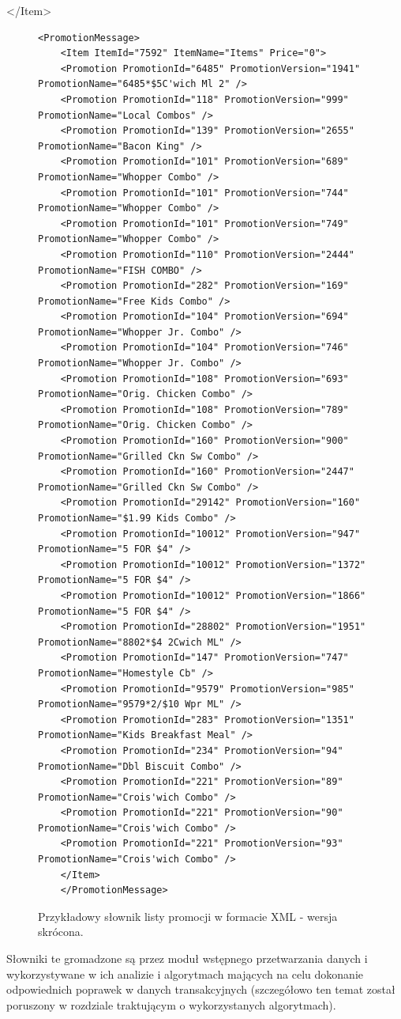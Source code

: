 \documentclass[a4paper]{book}
\begin{document}
</Item>
\begin{figure}
	\begin{lstlisting}[frame=single, breaklines=true]
	<PromotionMessage>
	<Item ItemId="7592" ItemName="Items" Price="0">
	<Promotion PromotionId="6485" PromotionVersion="1941" PromotionName="6485*$5C'wich Ml 2" />
	<Promotion PromotionId="118" PromotionVersion="999" PromotionName="Local Combos" />
	<Promotion PromotionId="139" PromotionVersion="2655" PromotionName="Bacon King" />
	<Promotion PromotionId="101" PromotionVersion="689" PromotionName="Whopper Combo" />
	<Promotion PromotionId="101" PromotionVersion="744" PromotionName="Whopper Combo" />
	<Promotion PromotionId="101" PromotionVersion="749" PromotionName="Whopper Combo" />
	<Promotion PromotionId="110" PromotionVersion="2444" PromotionName="FISH COMBO" />
	<Promotion PromotionId="282" PromotionVersion="169" PromotionName="Free Kids Combo" />
	<Promotion PromotionId="104" PromotionVersion="694" PromotionName="Whopper Jr. Combo" />
	<Promotion PromotionId="104" PromotionVersion="746" PromotionName="Whopper Jr. Combo" />
	<Promotion PromotionId="108" PromotionVersion="693" PromotionName="Orig. Chicken Combo" />
	<Promotion PromotionId="108" PromotionVersion="789" PromotionName="Orig. Chicken Combo" />
	<Promotion PromotionId="160" PromotionVersion="900" PromotionName="Grilled Ckn Sw Combo" />
	<Promotion PromotionId="160" PromotionVersion="2447" PromotionName="Grilled Ckn Sw Combo" />
	<Promotion PromotionId="29142" PromotionVersion="160" PromotionName="$1.99 Kids Combo" />
	<Promotion PromotionId="10012" PromotionVersion="947" PromotionName="5 FOR $4" />
	<Promotion PromotionId="10012" PromotionVersion="1372" PromotionName="5 FOR $4" />
	<Promotion PromotionId="10012" PromotionVersion="1866" PromotionName="5 FOR $4" />
	<Promotion PromotionId="28802" PromotionVersion="1951" PromotionName="8802*$4 2Cwich ML" />
	<Promotion PromotionId="147" PromotionVersion="747" PromotionName="Homestyle Cb" />
	<Promotion PromotionId="9579" PromotionVersion="985" PromotionName="9579*2/$10 Wpr ML" />
	<Promotion PromotionId="283" PromotionVersion="1351" PromotionName="Kids Breakfast Meal" />
	<Promotion PromotionId="234" PromotionVersion="94" PromotionName="Dbl Biscuit Combo" />
	<Promotion PromotionId="221" PromotionVersion="89" PromotionName="Crois'wich Combo" />
	<Promotion PromotionId="221" PromotionVersion="90" PromotionName="Crois'wich Combo" />
	<Promotion PromotionId="221" PromotionVersion="93" PromotionName="Crois'wich Combo" />
	</Item>
	</PromotionMessage>
	\end{lstlisting}
	\caption{Przykładowy słownik listy promocji w formacie XML - wersja skrócona.}
	\label{lst:przykladowySlownikPromocji}
\end{figure}
Słowniki te gromadzone są przez moduł wstępnego przetwarzania danych i wykorzystywane w ich analizie i algorytmach mających na celu dokonanie odpowiednich poprawek w danych transakcyjnych (szczegółowo ten temat został poruszony w rozdziale traktującym o wykorzystanych algorytmach).
\end{document}
